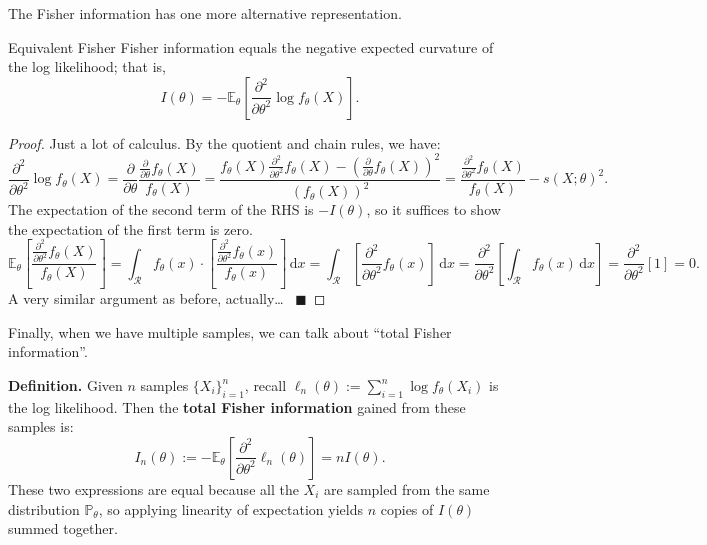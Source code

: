 The Fisher information has one more alternative representation.

\begin{theorem}{Equivalent Fisher}
    Fisher information equals the negative expected curvature of the log likelihood; that is,
    \[ I(\theta) = -\mathbb{E}_{\theta}\left[
        \frac{\partial^2}{\partial\theta^2} \log f_{\theta}(X)
    \right]. \]
\end{theorem}

\begin{proof}
    Just a lot of calculus.  By the quotient and chain rules, we have:
    \[ \frac{\partial^2}{\partial\theta^2} \log f_{\theta}(X)
    = \frac{\partial}{\partial\theta} \frac{\frac{\partial}{\partial\theta} f_{\theta}(X)}{f_{\theta}(X)} 
    = \frac{f_{\theta}(X) \frac{\partial^2}{\partial\theta^2} f_{\theta}(X)
    - \left(\frac{\partial}{\partial\theta} f_{\theta}(X)\right)^2}{
        \left(f_{\theta}(X)\right)^2
    }
    = \frac{\frac{\partial^2}{\partial\theta^2} f_{\theta}(X)}{f_{\theta}(X)}
    - s(X; \theta)^2. \]
    The expectation of the second term of the RHS is $-I(\theta)$,
    so it suffices to show the expectation of the first term is zero.
    \[ \mathbb{E}_{\theta}\left[\frac{\frac{\partial^2}{\partial\theta^2} f_{\theta}(X)}{f_{\theta}(X)}\right]
    = \int_{\mathcal{R}} f_{\theta}(x) \cdot \left[
        \frac{\frac{\partial^2}{\partial\theta^2} f_{\theta}(x)}{f_{\theta}(x)}
    \right] \, \mathrm{d}x
    = \int_{\mathcal{R}} \left[\frac{\partial^2}{\partial\theta^2} f_{\theta}(x)\right] \, \mathrm{d}x
    = \frac{\partial^2}{\partial\theta^2} \left[\int_{\mathcal{R}} f_{\theta}(x) \, \mathrm{d}x\right]
    = \frac{\partial^2}{\partial\theta^2} [1] = 0. \]
    A very similar argument as before, actually\dots ~ $\blacksquare$
\end{proof}

Finally, when we have multiple samples,
we can talk about ``total Fisher information''.

\textbf{Definition.} Given $n$ samples $\{X_i\}_{i = 1}^n$,
recall $\ell_n(\theta) := \sum_{i = 1}^n \log f_{\theta}(X_i)$
is the log likelihood.
Then the \textbf{total Fisher information} gained from these samples is:
\[ I_n(\theta) :=
-\mathbb{E}_{\theta}\left[\frac{\partial^2}{\partial\theta^2}\ell_n(\theta)\right]
= n I(\theta). \]
These two expressions are equal because all the $X_i$ are sampled from
the same distribution $\mathbb{P}_{\theta}$, so applying linearity of expectation
yields $n$ copies of $I(\theta)$ summed together.

